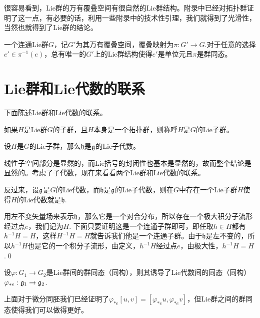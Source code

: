 很容易看到，Lie群的万有覆叠空间有很自然的Lie群结构。附录中已经对拓扑群证明了这一点，有必要的话，利用一些附录中的技术性引理，我们就得到了光滑性，当然也就得到了Lie群的结论。

\para 一个连通Lie群$G$，记$G'$为其万有覆叠空间，覆叠映射为$\pi:G'\to G$.对于任意的选择$e'\in \pi^{-1}(e)$，总有唯一的$G'$上的Lie群结构使得$e'$是单位元且$\pi$是群同态。

\section{Lie群和Lie代数的联系}

下面陈述Lie群和Lie代数的联系。

\para 如果$H$是Lie群$G$的子群，且$H$本身是一个拓扑群，则称呼$H$是$G$的Lie子群。

\para 设$H$是$G$的Lie子群，那么$\mathfrak{h}$是${\mathfrak{g}}$的Lie子代数。

线性子空间部分是显然的，而Lie括号的封闭性也基本是显然的，故而整个结论是显然的。考虑了子代数，现在来看看两个Lie群和Lie代数的联系。

\pro 反过来，设${\mathfrak{g}}$是$G$的Lie代数，而$\mathfrak{h}$是${\mathfrak{g}}$的Lie子代数，则在$G$中存在一个Lie子群$H$使得$H$的Lie代数就是$\mathfrak{h}$.

\proof 用左不变矢量场来表示$\mathfrak{h}$，那么它是一个对合分布，所以存在一个极大积分子流形经过点$e$，我们记为$H$. 下面只要证明这是一个连通子群即可，即任取$h\in H$都有$h^{-1}H=H$，这样$H^{-1}H=H$就告诉我们他是一个连通子群。由于$\mathfrak{h}$是左不变的，所以$h^{-1}H$也是它的一个积分子流形，由定义，$h^{-1}H$经过点$e$，由极大性，$h^{-1}H=H$.\qed




\para 设$\varphi:G_1\to G_2$是Lie群间的群同态（同构），则其诱导了Lie代数间的同态（同构）$\varphi_{*e}:{\mathfrak{g}}_1\to {\mathfrak{g}}_2$.

上面对于微分同胚我们已经证明了$\varphi_{*e}[u,v]=[\varphi_{*e}u,\varphi_{*e}v]$，但Lie群之间的群同态使得我们可以做得更好。

